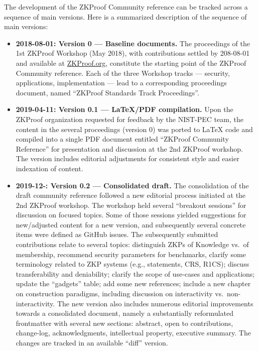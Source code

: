 \label{sec:prelim:change-log}


The development of the ZKProof Community reference can be tracked across a sequence of main versions.
Here is a summarized description of the sequence of main versions:

\begin{itemize}\setlength{\itemsep}{1em}

\item \textbf{2018-08-01: Version 0 --- Baseline documents.}
	The proceedings of the 1st ZKProof Workshop (May 2018), 
with contributions settled by 208-08-01 and available 
at \href{https://zkproof.org/documents}{ZKProof.org},
constitute the starting point of the ZKProof Community reference.
	Each of the three Workshop tracks --- security, applications, implementation --- 
lead to a corresponding proceedings document, 
named ``ZKProof Standards  Track Proceedings''.


\item \textbf{2019-04-11: Version 0.1 --- LaTeX/PDF compilation.}
	Upon the ZKProof organization requested for feedback by the NIST-PEC team, the content in the 
several proceedings (version 0) was ported to LaTeX code and compiled into a single PDF document 
entitled ``ZKProof Community Reference'' for presentation and discussion at the 2nd ZKProof workshop.
	The version includes editorial adjustments for consistent style and easier indexation of content.


\item \textbf{2019-12-: Version 0.2 --- Consolidated draft.}
	The consolidation of the draft community reference followed a new editorial process initiated at the 2nd ZKProof workshop.
	The workshop held several ``breakout sessions'' for discussion on focused topics.
	Some of those sessions yielded suggestions for new/adjusted content for a new version, 
and subsequently several concrete items were defined as GitHub issues.
	The subsequently submitted contributions relate to several topics:
distinguish ZKPs of Knowledge vs.\ of membership, recommend security parameters for benchmarks, 
clarify some terminology related to ZKP systems (e.g., statements, CRS, R1CS);
discuss transferability and deniability; clarify the scope of use-cases and applications; 
update the ``gadgets'' table; add some new references; 
include a new chapter on construction paradigms, including discussion on interactivity vs.\ non-interactivity.
	The new version also includes numerous editorial improvements towards a consolidated document, 
namely a substantially reformulated frontmatter with several new sections: 
abstract, open to contributions, change-log, acknowledgments, intellectual property, executive summary.
	The changes are tracked in an available ``diff'' version.
\end{itemize}


